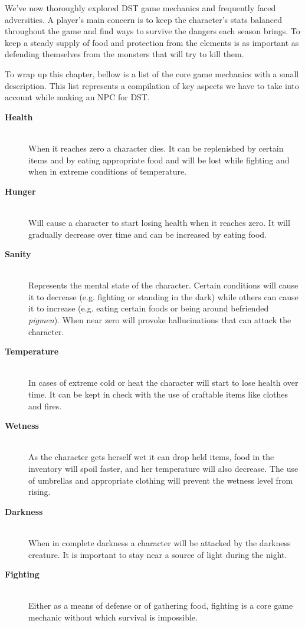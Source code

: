 \noindent We've now thoroughly explored \ac{DST} game mechanics and frequently faced adversities.
A player's main concern is to keep the character's stats balanced throughout the game and find ways to survive the dangers each season brings.
To keep a steady supply of food and protection from the elements is as important as defending themselves from the monsters that will try to kill them.

To wrap up this chapter, bellow is a list of the core game mechanics with a small description.
This list represents a compilation of key aspects we have to take into account while making an \ac{NPC} for \ac{DST}.

\begin{description}
	\item[\textbf{Health}] \hfill \\ When it reaches zero a character dies. It can be replenished by certain items and by eating appropriate food and will be lost while fighting and when in extreme conditions of temperature.
	\item[\textbf{Hunger}] \hfill \\ Will cause a character to start losing health when it reaches zero. It will gradually decrease over time and can be increased by eating food.
    \item[\textbf{Sanity}] \hfill \\ Represents the mental state of the character. Certain conditions will cause it to decrease (e.g. fighting or standing in the dark) while others can cause it to increase (e.g. eating certain foods or being around befriended \textit{pigmen}). When near zero will provoke hallucinations that can attack the character. 
	\item[\textbf{Temperature}] \hfill \\ In cases of extreme cold or heat the character will start to lose health over time. It can be kept in check with the use of craftable items like clothes and fires.
	\item[\textbf{Wetness}] \hfill \\ As the character gets herself wet it can drop held items, food in the inventory will spoil faster, and her temperature will also decrease. The use of umbrellas and appropriate clothing will prevent the wetness level from rising.
    \item[\textbf{Darkness}] \hfill \\ When in complete darkness a character will be attacked by the darkness creature. It is important to stay near a source of light during the night.
    \item[\textbf{Fighting}] \hfill \\ Either as a means of defense or of gathering food, fighting is a core game mechanic without which survival is impossible.
\end{description}